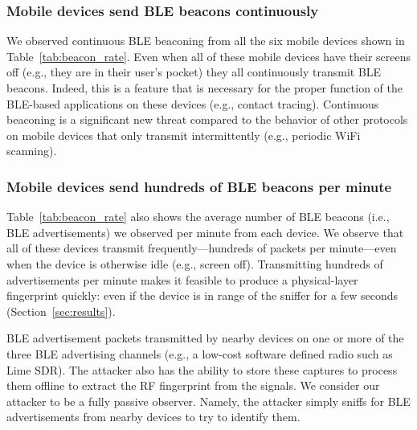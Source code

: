 \subsubsection*{Mobile devices send BLE beacons continuously}
%
We observed continuous BLE beaconing from all the six mobile devices shown in Table~\ref{tab:beacon_rate}.
%
%
Even when all of these mobile devices have their screens off (e.g., they are in their user's pocket) they all 
continuously transmit BLE beacons. Indeed, this is a feature that is necessary for the proper function of the BLE-based applications on these devices (e.g., contact tracing).
%
Continuous beaconing is a significant new threat compared to the behavior of other protocols on mobile devices that only transmit intermittently (e.g., periodic WiFi scanning).

\subsubsection*{Mobile devices send hundreds of BLE beacons per minute}

Table~\ref{tab:beacon_rate} also shows the average number of BLE beacons (i.e.,
BLE advertisements) we observed per minute from each device.
%
We observe that all of these devices transmit frequently---hundreds of packets
per minute---even when the device is otherwise idle (e.g., screen off).
%
%
Transmitting hundreds of advertisements per minute makes it feasible to produce a physical-layer fingerprint quickly: even if the device is in range of
the sniffer for a few seconds (Section~\ref{sec:results}).





BLE advertisement packets transmitted by
nearby devices on one or more of the three BLE advertising channels (e.g., a
low-cost software defined radio such as Lime SDR). The attacker also has the
ability to store these captures to process them offline to extract the RF
fingerprint from the signals.  We consider our attacker to be a fully passive
observer. Namely, the attacker simply sniffs for BLE advertisements from nearby
devices to try to identify them.


